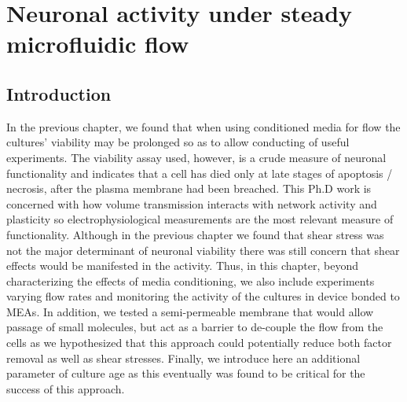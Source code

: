 \chapter{Neuronal activity under steady microfluidic flow}
\label{chap:activityAndFlow}

\section{Introduction}
In the previous chapter, we found that when using conditioned media for flow the cultures' viability may be prolonged so as to allow conducting of useful experiments. The viability assay used, however, is a crude measure of neuronal functionality and indicates that a cell has died only at late stages of apoptosis / necrosis, after the plasma membrane had been breached. This Ph.D work is concerned with how volume transmission interacts with network activity and plasticity so electrophysiological measurements are the most relevant measure of functionality. Although in the previous chapter we found that shear stress was not the major determinant of neuronal viability there was still concern that shear effects would be manifested in the activity. Thus, in this chapter, beyond characterizing the effects of media conditioning, we also include experiments varying flow rates and monitoring the activity of the cultures in device bonded to MEAs. In addition, we tested a semi-permeable membrane that would allow passage of small molecules, but act as a barrier to de-couple the flow from the cells as we hypothesized that this approach could potentially reduce both factor removal as well as shear stresses. Finally, we introduce here an additional parameter of culture age as this eventually was found to be critical for the success of this approach.

\label{sec:crossFlow:intro}

